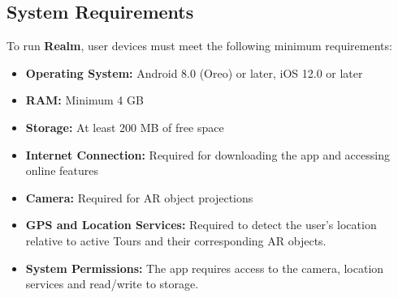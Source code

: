 \documentclass[12pt, titlepage]{article}
\newcommand{\progname}{Realm}
\begin{document}
\subsection{System Requirements}
To run \textbf{\progname{}}, user devices must meet the following minimum requirements:
\begin{itemize}[leftmargin=*]
    \item \textbf{Operating System:} Android 8.0 (Oreo) or later, iOS 12.0 or later
    \item \textbf{RAM:} Minimum 4 GB
    \item \textbf{Storage:} At least 200 MB of free space
    \item \textbf{Internet Connection:} Required for downloading the app and accessing online features
    \item \textbf{Camera:} Required for AR object projections
    \item \textbf{GPS and Location Services:} Required to detect the user's location relative to active Tours and their corresponding AR objects.
    \item \textbf{System Permissions:} The app requires access to the camera, location services and read/write to storage.
\end{itemize}
\end{document}
